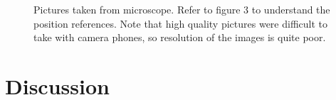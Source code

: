 \documentclass{article}
\begin{document}
\begin{figure}[H]
\caption{Pictures taken from microscope. Refer to figure 3 to understand the position references. Note that high quality pictures were difficult to take with camera phones, so resolution of the images is quite poor.}
\end{figure}


\section{Discussion}
\end{document}
